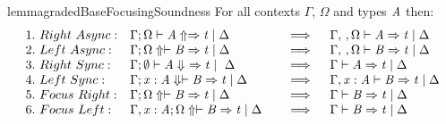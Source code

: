 %

\begin{restatable}{lemma}{gradedBaseFocusingSoundness}
For all contexts $\Gamma$, $\Omega$ and types $\mathit{A}$
then:
\begin{align*}
\begin{array}{lll}
 1.\ Right\ Async: & \Gamma  ;  \Omega  \vdash  \mathit{A}  \Uparrow \Rightarrow  \mathit{t}  \mid  \Delta \quad &\implies \quad \Gamma  ,  \,  ,  \Omega  \vdash  \mathit{A}  \Rightarrow  \mathit{t}  \mid  \Delta\\
 2.\ Left\ Async: & \Gamma  ;  \Omega  \Uparrow \vdash  \mathit{B}  \Rightarrow  \mathit{t}  \mid  \Delta \quad &\implies \quad \Gamma  ,  \,  ,  \Omega  \vdash  \mathit{B}  \Rightarrow  \mathit{t}  \mid  \Delta\\
 3.\ Right\ Sync: & \Gamma ; \emptyset \vdash \mathit{A} \Downarrow\ \Rightarrow \mathit{t} \mid\  \Delta \quad &\implies \quad \Gamma  \vdash  \mathit{A}  \Rightarrow  \mathit{t}  \mid  \Delta\\
 4.\ Left\ Sync: & \Gamma  ;    \mathit{x}  :  \mathit{A}    \Downarrow \vdash  \mathit{B}  \Rightarrow  \mathit{t}  \mid  \Delta \quad &\implies \quad \Gamma  ,   \mathit{x}  :  \mathit{A}   \vdash  \mathit{B}  \Rightarrow  \mathit{t}  \mid  \Delta\\
 5.\ Focus\ Right: & \Gamma  ;  \Omega  \Uparrow \vdash  \mathit{B}  \Rightarrow  \mathit{t}  \mid  \Delta \quad &\implies \quad \Gamma  \vdash  \mathit{B}  \Rightarrow  \mathit{t}  \mid  \Delta\\
 6.\ Focus\ Left: & \Gamma  ,   \mathit{x}  :  \mathit{A}   ;  \Omega  \Uparrow \vdash  \mathit{B}  \Rightarrow  \mathit{t}  \mid  \Delta \quad &\implies \quad \Gamma  \vdash  \mathit{B}  \Rightarrow  \mathit{t}  \mid  \Delta
\end{array}
\end{align*}
\end{restatable}

